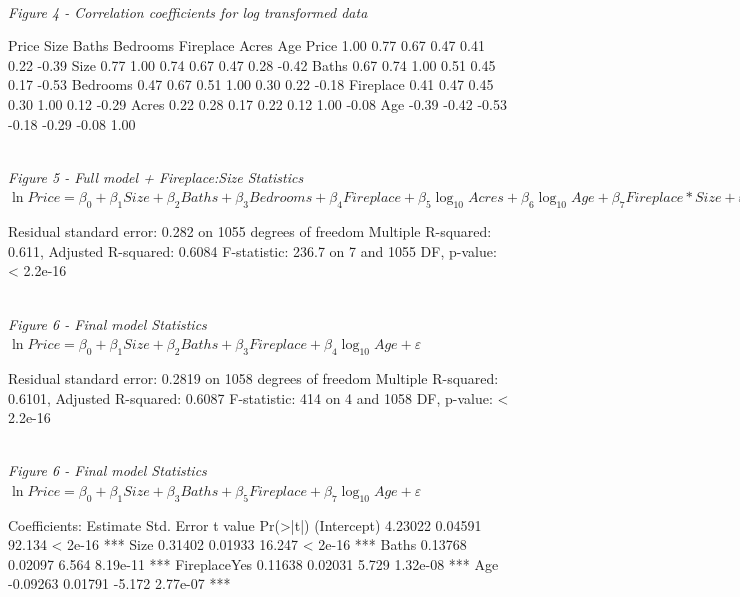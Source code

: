 \documentclass[10pt,A4,makeidx]{article}
\begin{document}
  \emph{\\Figure 4 - Correlation coefficients for log transformed data}
  \begin{Soutput}
              Price  Size Baths Bedrooms Fireplace Acres   Age
    Price      1.00  0.77  0.67     0.47      0.41  0.22 -0.39
    Size       0.77  1.00  0.74     0.67      0.47  0.28 -0.42
    Baths      0.67  0.74  1.00     0.51      0.45  0.17 -0.53
    Bedrooms   0.47  0.67  0.51     1.00      0.30  0.22 -0.18
    Fireplace  0.41  0.47  0.45     0.30      1.00  0.12 -0.29
    Acres      0.22  0.28  0.17     0.22      0.12  1.00 -0.08
    Age       -0.39 -0.42 -0.53    -0.18     -0.29 -0.08  1.00
  \end{Soutput}
  
  \emph{\\Figure 5 - Full model + Fireplace:Size Statistics\\}
  $\ln Price = \beta _0 + \beta _1 Size + \beta _2 Baths + \beta _3 Bedrooms + \beta _4 Fireplace + \beta _5 \log_{10}Acres + \beta _6 \log_{10}Age + \beta _7 Fireplace*Size + \varepsilon$
  \begin{Soutput}
    Residual standard error: 0.282 on 1055 degrees of freedom
    Multiple R-squared:  0.611,	Adjusted R-squared:  0.6084 
    F-statistic: 236.7 on 7 and 1055 DF,  p-value: < 2.2e-16
  \end{Soutput}

  \emph{\\Figure 6 - Final model Statistics\\}
  $\ln Price = \beta _0 + \beta _1 Size + \beta _2 Baths + \beta _3 Fireplace + \beta _4 \log_{10}Age + \varepsilon$
  \begin{Soutput}
    Residual standard error: 0.2819 on 1058 degrees of freedom
    Multiple R-squared:  0.6101,	Adjusted R-squared:  0.6087 
    F-statistic:   414 on 4 and 1058 DF,  p-value: < 2.2e-16
  \end{Soutput}
  
  \emph{\\Figure 6 - Final model Statistics\\}
  $\ln Price = \beta _0 + \beta _1 Size + \beta _3 Baths + \beta _5 Fireplace + \beta _7 \log_{10}Age + \varepsilon$
  \begin{Soutput}
Coefficients:
             Estimate Std. Error t value Pr(>|t|)    
(Intercept)   4.23022    0.04591  92.134  < 2e-16 ***
Size          0.31402    0.01933  16.247  < 2e-16 ***
Baths         0.13768    0.02097   6.564 8.19e-11 ***
FireplaceYes  0.11638    0.02031   5.729 1.32e-08 ***
Age          -0.09263    0.01791  -5.172 2.77e-07 ***
  \end{Soutput}
\end{document}
